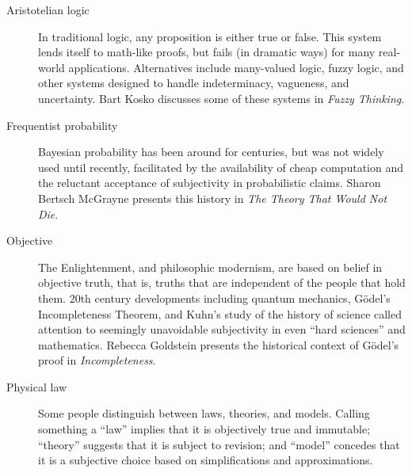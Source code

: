 \documentclass[12pt]{book}
\theoremstyle{exercise}
\newcommand{\myrightarrow}{\ensuremath \rightarrow}
\begin{document}
\begin{description}

\item[Aristotelian logic \myrightarrow~many-valued logic] In
  traditional logic, any proposition is either true or false.  This
  system lends itself to math-like proofs, but fails (in dramatic
  ways) for many real-world applications.  Alternatives include
  many-valued logic, fuzzy logic, and other systems designed to handle
  indeterminacy, vagueness, and uncertainty.  Bart
  Kosko discusses some of these systems in {\em Fuzzy Thinking}.


\item[Frequentist probability \myrightarrow~Bayesianism] Bayesian
  probability has been around for centuries, but was not widely used
  until recently, facilitated by the availability of cheap computation
  and the reluctant acceptance of subjectivity
  in probabilistic claims.  Sharon Bertsch McGrayne presents this
  history in {\em The Theory That Would Not Die}.


\item[Objective \myrightarrow~subjective] The Enlightenment, and
  philosophic modernism, are based on belief in objective truth, that
  is, truths that are independent of the people that hold them.  20th
  century developments including quantum mechanics, G\"{o}del's
  Incompleteness Theorem, and Kuhn's study of the history of science
  called attention to seemingly unavoidable subjectivity in
  even ``hard sciences'' and mathematics.  Rebecca Goldstein presents
  the historical context of G\"{o}del's proof in {\it Incompleteness}.


\item[Physical law \myrightarrow~theory \myrightarrow~model] Some
  people distinguish between laws, theories, and models.  Calling
  something a ``law'' implies that it is objectively true and
  immutable; ``theory'' suggests that it is subject to revision; and
  ``model'' concedes that it is a subjective choice based on
  simplifications and approximations.  


\end{description}
\end{document}
